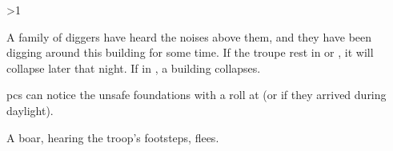 \ifnum\value{temperature}>1

\mouthdigger

A family of \glspl{digger} have heard the noises above them, and they have been digging around this building for some time.
If the troupe rest in  or , it will collapse later that night.
If in , a building collapses.

\Glspl{pc} can notice the unsafe foundations with a  roll at \tn[12] (or \tn[10] if they arrived during daylight).


\else

A boar, hearing the troop's footsteps, flees.

\boar

\fi

